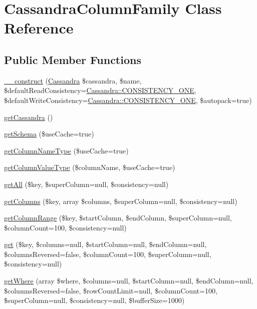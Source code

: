 \hypertarget{classCassandraColumnFamily}{
\section{CassandraColumnFamily Class Reference}
\label{classCassandraColumnFamily}
}
\subsection*{Public Member Functions}
\begin{DoxyCompactItemize}
\item 
\hyperlink{classCassandraColumnFamily_a1b091f156f08bc69f16ff20a7faae39f}{\_\-\_\-construct} (\hyperlink{classCassandra}{Cassandra} \$cassandra, \$name, \$defaultReadConsistency=\hyperlink{classCassandra_afd35e5b7419ce2915891c349a44b6f22}{Cassandra::CONSISTENCY\_\-ONE}, \$defaultWriteConsistency=\hyperlink{classCassandra_afd35e5b7419ce2915891c349a44b6f22}{Cassandra::CONSISTENCY\_\-ONE}, \$autopack=true)
\item 
\hyperlink{classCassandraColumnFamily_a000c9f902dd0a2b7577608b31aaa0085}{getCassandra} ()
\item 
\hyperlink{classCassandraColumnFamily_aa5e0d45507ac78641f7df1d0fc7845fd}{getSchema} (\$useCache=true)
\item 
\hyperlink{classCassandraColumnFamily_ab41e2e964834570a3cf8ffc6b60eaefa}{getColumnNameType} (\$useCache=true)
\item 
\hyperlink{classCassandraColumnFamily_aa62bec66626eba474c8fcf51dbe0eda5}{getColumnValueType} (\$columnName, \$useCache=true)
\item 
\hyperlink{classCassandraColumnFamily_a6bb5aa6148e8350990c1a61021974470}{getAll} (\$key, \$superColumn=null, \$consistency=null)
\item 
\hyperlink{classCassandraColumnFamily_a06bfbe9d4a44eb9c8b08037ed3b96494}{getColumns} (\$key, array \$columns, \$superColumn=null, \$consistency=null)
\item 
\hyperlink{classCassandraColumnFamily_abd1ec26e68a338f18ef1da088574366e}{getColumnRange} (\$key, \$startColumn, \$endColumn, \$superColumn=null, \$columnCount=100, \$consistency=null)
\item 
\hyperlink{classCassandraColumnFamily_a0ae94f62112a09cfa34ad55b7c3cc641}{get} (\$key, \$columns=null, \$startColumn=null, \$endColumn=null, \$columnsReversed=false, \$columnCount=100, \$superColumn=null, \$consistency=null)
\item 
\hyperlink{classCassandraColumnFamily_a70850301cfaf85c4c170453a8aaeab9b}{getWhere} (array \$where, \$columns=null, \$startColumn=null, \$endColumn=null, \$columnsReversed=false, \$rowCountLimit=null, \$columnCount=100, \$superColumn=null, \$consistency=null, \$bufferSize=1000)

\end{DoxyCompactItemize}
